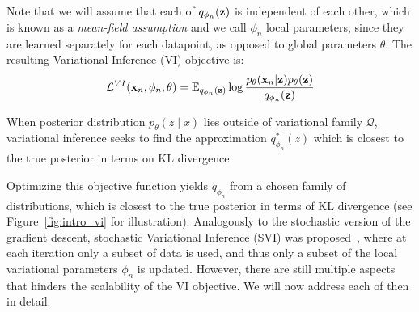 Note that we will assume that each of $q_{\phi_n}({\mathbf{z}})$ is independent of each other, which is known as a \textit{mean-field assumption} and we call $\phi_n$ local parameters, since they are learned separately for each datapoint, as opposed to global parameters $\theta$. The resulting Variational Inference (VI) objective is: 
\begin{equation}
     \mathcal{L}^{VI}({\mathbf{x}}_n, \phi_n, \theta) =  \mathbb{E}_{q_{\phi_n}({\mathbf{z}})}\log  \frac{p_{\theta}({\mathbf{x}}_n|{\mathbf{z}})p_{\theta}({\mathbf{z}})}{q_{\phi_n}({\mathbf{z}})}
\end{equation}
\begin{marginfigure}
\caption{When posterior distribution $ p_{\theta}(z \mid x) $ lies outside of variational family $\mathcal{Q}$, variational inference seeks to find the approximation $q^*_{\phi_n}(z) $ which is closest to the true posterior in terms on KL divergence} \label{fig:intro_vi}
\end{marginfigure}
Optimizing this objective function yields $q_{\phi_n}$ from a chosen family of distributions, which is closest to the true posterior in terms of KL divergence (see Figure~\ref{fig:intro_vi} for illustration). Analogously to the stochastic version of the gradient descent, stochastic Variational Inference (SVI) was proposed~\citep{hoffman2013stochastic}, where at each iteration only a subset of data is used, and thus only a subset of the local variational parameters $\phi_n$ is updated. 
However, there are still multiple aspects that hinders the scalability of the VI objective. We will now address each of then in detail. 


